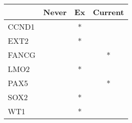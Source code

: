 \begin{tabular}{lccc}
\toprule
{} & Never & Ex & Current \\
\midrule
CCND1 &       &  * &         \\
EXT2  &       &  * &         \\
FANCG &       &    &       * \\
LMO2  &       &  * &         \\
PAX5  &       &    &       * \\
SOX2  &       &  * &         \\
WT1   &       &  * &         \\
\bottomrule
\end{tabular}
